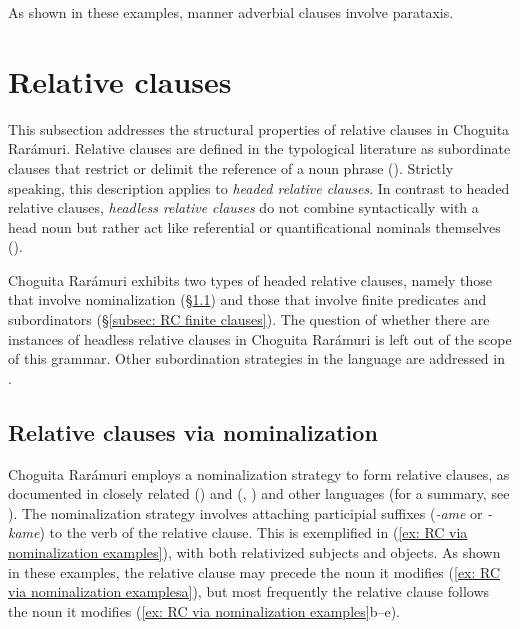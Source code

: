 As shown in these examples, manner adverbial clauses involve parataxis.

\section{Relative clauses}
\label{sec: relative clauses}

This subsection addresses the structural properties of relative clauses in Choguita Rarámuri. Relative clauses are defined in the typological literature as subordinate clauses that restrict or delimit the reference of a noun phrase (\citealt{andrews2007relative}). Strictly speaking, this description applies to \textit{headed relative clauses}. In contrast to headed relative clauses, \textit{headless relative clauses} do not combine syntactically with a head noun but rather act like referential or quantificational nominals themselves (\citealt{caponigro2020introducing}).

Choguita Rarámuri exhibits two types of headed relative clauses, namely those that involve nominalization (§\ref{subsec: RC nominalization}) and those that involve finite predicates and subordinators (§\ref{subsec: RC finite clauses}). The question of whether there are instances of headless relative clauses in Choguita Rarámuri is left out of the scope of this grammar. Other subordination strategies in the language are addressed in .

\subsection{Relative clauses via nominalization}
\label{subsec: RC nominalization}

Choguita Rarámuri employs a nominalization strategy to form relative clauses, as documented in closely related  (\citealt[179]{miller1996guarijio}) and  (\citealt{gonzalez2012relative}, \citealt{guerrero2012relative}) and other  languages (for a summary, see \citealt{garciasalidoheadless}). The nominalization strategy involves attaching participial suffixes (\textit{-ame} or \textit{-kame}) to the verb of the relative clause. This is exemplified in (\ref{ex: RC via nominalization examples}), with both relativized subjects and objects. As shown in these examples, the relative clause may precede the noun it modifies (\ref{ex: RC via nominalization examplesa}), but most frequently the relative clause follows the noun it modifies (\ref{ex: RC via nominalization examples}b--e).

